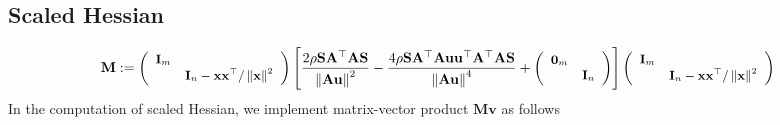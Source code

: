 \documentclass{article}
\newcommand{\assign}{:=}
\newcommand{\x}{\mathbf{x}}
\newcommand{\A}{\mathbf{A}}
\newcommand{\0}{\textbf{0}}
\newcommand{\I}{\mathbf{I}}
\newcommand{\M}{\mathbf{M}}
\newcommand{\tmu}{\mathbf{u}}
\newcommand{\bs}{\mathbf{S}}
\newcommand{\tmv}{\mathbf{v}}
\begin{document}
\subsection{Scaled Hessian}

\[ \M \assign \small{\left(\begin{array}{cc}
     \I_m & \\
     & \I_n - \x \x^{\top} / \left\| \x \right\|^2
   \end{array}\right)} \left[ \frac{2 \rho \bs \A^{\top} \A \bs}{\left\| \A
   \tmu \right\|^2} - \frac{4 \rho \bs \A^{\top} \A \tmu \tmu^{\top} \A^{\top}
   \A \bs}{\left\| \A \tmu \right\|^4} + \small{\left(\begin{array}{cc}
     \0_m & \\
     & \I_n
   \end{array}\right)} \right] \small{\left(\begin{array}{cc}
     \I_m & \\
     & \I_n - \x \x^{\top} / \left\| \x \right\|^2
   \end{array}\right)} \]
In the computation of scaled Hessian, we implement matrix-vector product $\M
\tmv$ as follows
\end{document}
